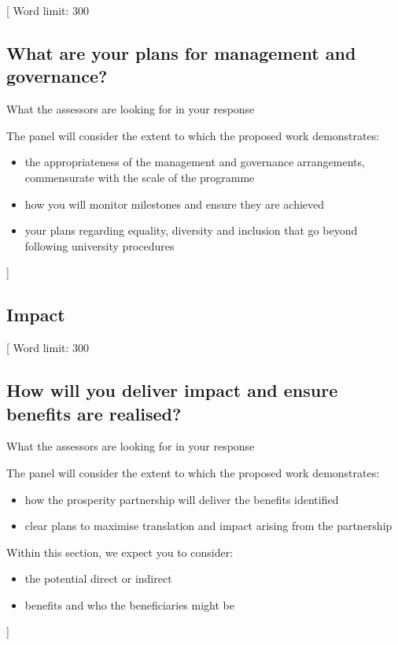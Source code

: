 \documentclass{article}
\newcommand{\desc}[1]{{\leavevmode\color{blue}[#1]}}
\begin{document}
\desc{
Word limit: 300

\subsection*{What are your plans for management and governance?}

What the assessors are looking for in your response

The panel will consider the extent to which the proposed work demonstrates:

\begin{itemize}

    \item the appropriateness of the management and governance arrangements,
commensurate with the scale of the programme

    \item how you will monitor milestones and ensure they are achieved

    \item your plans regarding equality, diversity and inclusion that go beyond following
university procedures

\end{itemize}

}

% 

\subsection{Impact}

\desc{
Word limit: 300

\subsection*{How will you deliver impact and ensure benefits are realised?}

What the assessors are looking for in your response

The panel will consider the extent to which the proposed work demonstrates:

\begin{itemize}

    \item how the prosperity partnership will deliver the benefits identified
    \item clear plans to maximise translation and impact arising from the partnership

\end{itemize}

Within this section, we expect you to consider:

\begin{itemize}

    \item the potential direct or indirect

    \item benefits and who the beneficiaries might be

\end{itemize}

}
\end{document}
